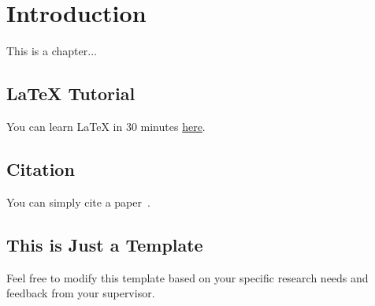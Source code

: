 \chapter{Introduction}

This is a chapter...


\section{LaTeX Tutorial}

You can learn LaTeX in 30 minutes \href{https://www.overleaf.com/learn/latex/Learn_LaTeX_in_30_minutes}{here}.


\section{Citation}

You can simply cite a paper~\cite{burkov2019hundred}.


\section{This is Just a Template}

Feel free to modify this template based on your specific research needs and feedback from your supervisor.